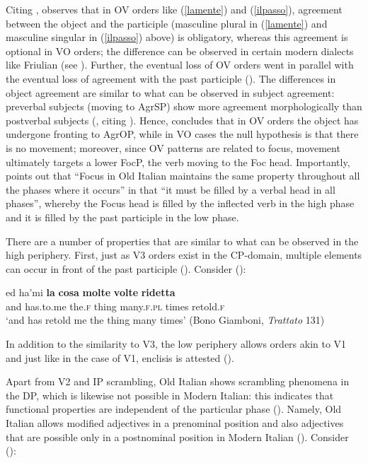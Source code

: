 Citing \citet{egerland1996}, \citet[267--268]{poletto2006} observes that in OV orders like (\ref{lamente}) and (\ref{ilpasso}), agreement between the object and the participle (masculine plural in (\ref{lamente}) and masculine singular in (\ref{ilpasso}) above) is obligatory, whereas this agreement is optional in VO orders; the difference can be observed in certain modern dialects like Friulian (see \citealt{paoli1997ma}). Further, the eventual loss of OV orders went in parallel with the eventual loss of agreement with the past participle (\citealt[268]{poletto2006}). The differences in object agreement are similar to what can be observed in subject agreement: preverbal subjects (moving to AgrSP) show more agreement morphologically than postverbal subjects (\citealt[268--269]{poletto2006}, citing \citealt{guastirizzi2002}). Hence, \citet[269, 271]{poletto2006} concludes that in OV orders the object has undergone fronting to AgrOP, while in VO cases the null hypothesis is that there is no movement; moreover, since OV patterns are related to focus, movement ultimately targets a lower FocP, the verb moving to the Foc head. Importantly, \citet[271]{poletto2006} points out that ``Focus in Old Italian maintains the same property throughout all the phases where it occurs'' in that ``it must be filled by a verbal head in all phases'', whereby the Focus head is filled by the inflected verb in the high phase and it is filled by the past participle in the low phase.

There are a number of properties that are similar to what can be observed in the high periphery. First, just as V3 orders exist in the CP-domain, multiple elements can occur in front of the past participle (\citealt[275]{poletto2006}). Consider (\citealt[275, ex. 25a]{poletto2006}):

\ea \gll ed ha'mi \textbf{la} \textbf{cosa} \textbf{molte} \textbf{volte} \textbf{ridetta}\\
and has.to.me the.\textsc{f} thing many.\textsc{f.pl} times retold.\textsc{f}\\
\glt `and has retold me the thing many times' (Bono Giamboni, \textit{Trattato} 131)
\z

In addition to the similarity to V3, the low periphery allows orders akin to V1 and just like in the case of V1, enclisis is attested (\citealt[276]{poletto2006}).

Apart from V2 and IP scrambling, Old Italian shows scrambling phenomena in the DP, which is likewise not possible in Modern Italian: this indicates that functional properties are independent of the particular phase (\citealt[277]{poletto2006}). Namely, Old Italian allows modified adjectives in a prenominal position and also adjectives that are possible only in a postnominal position in Modern Italian (\citealt[277--278]{poletto2006}). Consider (\citealt[277, ex. 30c]{poletto2006}):

